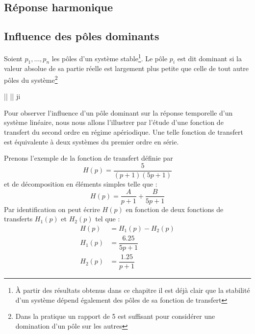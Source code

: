 \subsection{Réponse harmonique}

\subsection{Influence des pôles dominants}

Soient $p_1,\ldots,p_n$ les pôles d'un système stable\footnote{À partir 
des résultats obtenus dans ce chapitre il est déjà clair que la stabilité
d'un système dépend également des pôles de sa fonction de transfert}.
Le pôle $p_i$ est dit dominant si la valeur absolue
de sa partie réelle est largement plus petite que celle de tout autre pôles 
du système\footnote{Dans la pratique un rapport de 5 est 
suffisant pour considérer une domination d'un pôle sur les autres}
\begin{bequation}
	\big|\big| \ll \big|\big|\;\; \forall j\neq i
\end{bequation}

Pour observer l'influence d'un pôle dominant sur 
la réponse temporelle d'un système linéaire, nous
nous allons l'illustrer par l'étude d'une fonction 
de transfert du second ordre en régime apériodique.
Une telle fonction de transfert est équivalente à deux
systèmes du premier ordre en série.

Prenons l'exemple de la fonction de transfert définie par  
$$
H(p)=\dfrac{5}{(p+1)(5p+1)}
$$
et de décomposition en éléments simples telle que :
$$
H(p)=\dfrac{A}{p+1}+\dfrac{B}{5p+1}
$$
Par identification on peut écrire $H(p)$ en fonction de
deux fonctions de transferts $H_1(p)$ et $H_2(p)$ tel que :
\begin{align*}
	H(p)&=H_1(p)-H_2(p)\\
	H_1(p)&=\dfrac{6.25}{5p+1}\\
	H_2(p)&=\dfrac{1.25}{p+1}
\end{align*}

